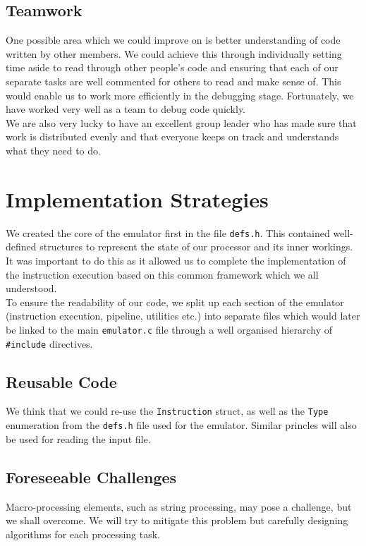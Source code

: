 \documentclass[11pt]{article}
\begin{document}
\subsection{Teamwork}
One possible area which we could improve on is better understanding of code written by other members. We could achieve this through individually setting time aside to read through other people's code and ensuring that each of our separate tasks are well commented for others to read and make sense of. This would enable us to work more efficiently in the debugging stage. Fortunately, we have worked very well as a team to debug code quickly.\\

We are also very lucky to have an excellent group leader who has made sure that work is distributed evenly and that everyone keeps on track and understands what they need to do.

\section{Implementation Strategies}
We created the core of the emulator first in the file \texttt{defs.h}. This contained well-defined structures to represent the state of our processor and its inner workings. It was important to do this as it allowed us to complete the implementation of the instruction execution based on this common framework which we all understood.\\

To ensure the readability of our code, we split up each section of the emulator (instruction execution, pipeline, utilities etc.) into separate files which would later be linked to the main \texttt{emulator.c} file through a well organised hierarchy of \texttt{{\#}include} directives.

\subsection{Reusable Code}

We think that we could re-use the \texttt{Instruction} struct, as well as the \texttt{Type} enumeration from the \texttt{defs.h} file used for the emulator. Similar princles will also be used for reading the input file.

\subsection{Foreseeable Challenges}
Macro-processing elements, such as string processing, may pose a challenge, but we shall overcome. We will try to mitigate this problem but carefully designing algorithms for each processing task.
\end{document}
